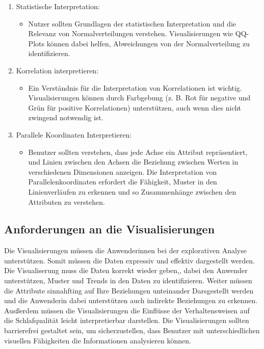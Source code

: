 \documentclass[usegeometry=true]{scrartcl}
\begin{document}
\begin{enumerate}
  \item Statistische Interpretation:
  \begin{itemize}
    \item Nutzer sollten Grundlagen der statistischen Interpretation und die Relevanz von Normalverteilungen verstehen. Visualisierungen wie QQ-Plots können dabei helfen, Abweichungen von der Normalverteilung zu identifizieren.
  \end{itemize}
  \item Korrelation interpretieren:
  \begin{itemize}
    \item Ein Verständnis für die Interpretation von Korrelationen ist wichtig. Visualisierungen können durch Farbgebung (z. B. Rot für negative und Grün für positive Korrelationen) unterstützen, auch wenn dies nicht zwingend notwendig ist.
  \end{itemize}
  \item Parallele Koordinaten Interpretieren:
  \begin{itemize}
    \item Benutzer sollten verstehen, dass jede Achse ein Attribut repräsentiert, und Linien zwischen den Achsen die Beziehung zwischen Werten in verschiedenen Dimensionen anzeigen. Die Interpretation von Parallelenkoordinaten erfordert die Fähigkeit, Muster in den Linienverläufen zu erkennen und so Zusammenhänge zwischen den Attributen zu verstehen.
  \end{itemize}
\end{enumerate}


\subsection{Anforderungen an die Visualisierungen}
Die Visualisierungen müssen die Anwenderinnen bei der explorativen Analyse unterstützen. Somit müssen die Daten expressiv und effektiv dargestellt werden. 
Die Visualiserung muss die Daten korrekt wieder geben,, dabei den Anwender  unterstützen, Muster und Trends in den Daten zu identifizieren.
Weiter müssen die Attribute sinnahfting auf Ihre Beziehungen unteinander Darsgestellt werden und die Anwenderin dabei unterstützen auch indirekte Beziehungen zu erkennen. 
Ausßerdem müssen die Visualisierungen die Einflüsse der Verhaltensweisen auf die Schlafqualität leicht interpretierbar darstellen.
Die Visualisierungen sollten barrierefrei gestaltet sein, um sicherzustellen, dass Benutzer mit unterschiedlichen visuellen Fähigkeiten die Informationen analysieren können.
\end{document}

